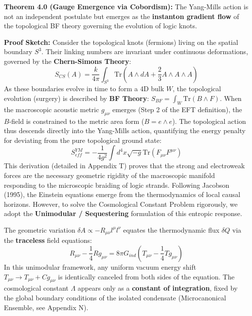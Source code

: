 \documentclass[a4paper,12pt]{article}
\begin{document}
\textbf{Theorem 4.0 (Gauge Emergence via Cobordism):} The Yang-Mills action is not an independent postulate but emerges as the \textbf{instanton gradient flow} of the topological BF theory governing the evolution of logic knots.

\textbf{Proof Sketch:}
Consider the topological knots (fermions) living on the spatial boundary $S^3$. Their linking numbers are invariant under continuous deformations, governed by the \textbf{Chern-Simons Theory}:
\begin{equation}
    S_{CS}(A) = \frac{k}{4\pi} \int_{S^3} \text{Tr}\left(A \wedge dA + \frac{2}{3}A \wedge A \wedge A \right)
\end{equation}
As these boundaries evolve in time to form a 4D bulk $W$, the topological evolution (surgery) is described by \textbf{BF Theory}: $S_{BF} = \int_W \text{Tr}(B \wedge F)$.
When the macroscopic acoustic metric $g_{\mu\nu}$ emerges (Step 2 of the EFT definition), the $B$-field is constrained to the metric area form ($B = e \wedge e$). The topological action thus descends directly into the Yang-Mills action, quantifying the energy penalty for deviating from the pure topological ground state:
\begin{equation}
    S_{eff}^{YM} = - \frac{1}{4g^2} \int d^4x \sqrt{-g} \text{Tr}(F_{\mu\nu} F^{\mu\nu})
\end{equation}
This derivation (detailed in Appendix T) proves that the strong and electroweak forces are the necessary geometric rigidity of the macroscopic manifold responding to the microscopic braiding of logic strands.
Following Jacobson (1995), the Einstein equations emerge from the thermodynamics of local causal horizons. However, to solve the Cosmological Constant Problem rigorously, we adopt the \textbf{Unimodular / Sequestering} formulation of this entropic response.

The geometric variation $\delta A \propto -R_{\mu\nu} l^\mu l^\nu$ equates the thermodynamic flux $\delta Q$ via the \textbf{traceless} field equations:
\begin{equation}
    R_{\mu\nu} - \frac{1}{4}R g_{\mu\nu} = 8\pi G_{ind} \left( T_{\mu\nu} - \frac{1}{4}T g_{\mu\nu} \right)
\end{equation}
In this unimodular framework, any uniform vacuum energy shift $T_{\mu\nu} \to T_{\mu\nu} + C g_{\mu\nu}$ is identically canceled from both sides of the equation. The cosmological constant $\Lambda$ appears only as a \textbf{constant of integration}, fixed by the global boundary conditions of the isolated condensate (Microcanonical Ensemble, see Appendix N).
\end{document}
